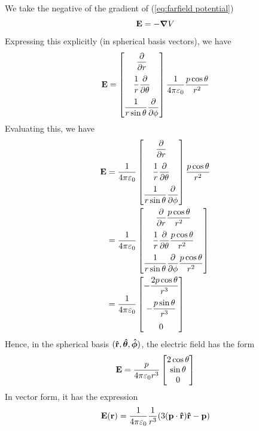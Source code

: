 \begin{enumerate}
				  We take the negative of the gradient of (\ref{eq:farfield potential})
				  \begin{equation}
				      \vb{E} = -\grad V
				  \end{equation}
				  Expressing this explicitly (in spherical basis vectors), we have
				  \begin{equation}
					  \vb{E} = \bmqty{
						  \displaystyle \pdv{}{r}\\[10pt]
						  \displaystyle \frac{1}{r}  \pdv{}{\theta}\\[10pt]
						  \displaystyle \frac{1}{r\sin\theta}  \pdv{}{\phi}
					  }
					  \frac{1}{4\pi\epsz}\frac{p\cos\theta}{r^2} 
				  \end{equation}
				  Evaluating this, we have
				  \begin{align}
					  \vb{E} 
					  &= 
					  \frac{1}{4\pi\epsz}
					  \bmqty{
						  \displaystyle \pdv{}{r}\\[10pt]
						  \displaystyle \frac{1}{r}  \pdv{}{\theta}\\[10pt]
						  \displaystyle \frac{1}{r\sin\theta}  \pdv{}{\phi}
					  }
					  \frac{p\cos\theta}{r^2} \\
					  &=
					  \frac{1}{4\pi\epsz}
					  \bmqty{
						  \displaystyle \pdv{}{r}
						  \frac{p\cos\theta}{r^2}\\[10pt] 
						  \displaystyle \frac{1}{r}  \pdv{}{\theta}
						  \frac{p\cos\theta}{r^2}\\[10pt] 
						  \displaystyle \frac{1}{r\sin\theta}  \pdv{}{\phi}
						  \frac{p\cos\theta}{r^2}
					  }\\
					  &=
					  \frac{1}{4\pi\epsz}
					  \bmqty{
						  -\dfrac{2p\cos\theta}{r^3}\\[10pt] 
						  -\dfrac{p\sin\theta}{r^3}\\[10pt] 
						  0
					  }\\
				  \end{align}
				  Hence, in the spherical basis $(\vu{r},\vu*{\theta},\vu*{\phi})$, the electric field has the form
				  \begin{equation}
				      \vb{E} 
					  =
					  \frac{p}{4\pi\epsz r^3}
					  \bmqty{
						  2\cos\theta\\
						  \sin\theta\\
						  0
					  }
				  \end{equation}
				  In vector form, it has the expression
				  \begin{equation}
					  \vb{E}(\vb r) = \frac{1}{4\pi\epsz}\frac{1}{r^3}
					  \pqty{
						  3(\vb{p}\cdot\vu{r})\vu{r} - \vb{p}
					  }
				  \end{equation}
		\end{enumerate}
